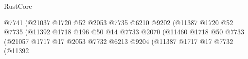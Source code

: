 \begin{lexlean}{RustCore}
\begin{coremodule}
                                                              @7741
                                                              (@21037
                                                                @1720
                                                                @52
                                                                @2053
                                                                @7735
                                                                @6210
                                                                @9202
                                                                (@11387
                                                                  @1720
                                                                  @52
                                                                  @7735
                                                                  (@11392
                                                                    @1718
                                                                    @196
                                                                    @50
                                                                    @14
                                                                    @7733
                                                                    @2070
                                                                    (@11460
                                                                      @1718
                                                                      @50
                                                                      @7733
                                                                      (@21057
                                                                        @1717
                                                                        @17
                                                                        @2053
                                                                        @7732
                                                                        @6213
                                                                        @9204
                                                                        (@11387
                                                                          @1717
                                                                          @17
                                                                          @7732
                                                                          (@11392

\end{coremodule}
\end{lexlean}
